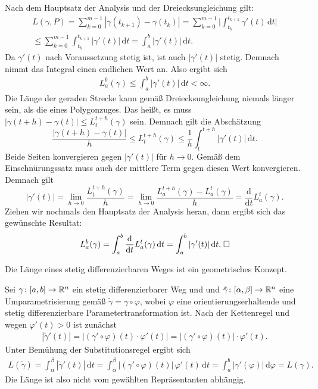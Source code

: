 \noindent{}
Nach dem Hauptsatz der Analysis und der Dreiecksungleichung gilt:
\begin{gather}
L(\gamma,P) = \sum_{k=0}^{m-1} |\gamma(t_{k+1})-\gamma(t_k)|
= \sum_{k=0}^{m-1} \Big|\int_{t_k}^{t_{k+1}}\gamma'(t)\,\mathrm dt\Big|\\
\le \sum_{k=0}^{m-1} \int_{t_k}^{t_{k+1}} |\gamma'(t)|\,\mathrm dt
= \int_a^b |\gamma'(t)|\,\mathrm dt.
\end{gather}
Da $\gamma'(t)$ nach Voraussetzung stetig ist, ist auch $|\gamma'(t)|$
stetig. Demnach nimmt das Integral einen endlichen Wert an. Also ergibt
sich
\begin{gather}
L_a^b(\gamma) \le \int_a^b |\gamma'(t)|\,\mathrm dt < \infty.
\end{gather}
Die Länge der geraden Strecke kann gemäß Dreiecksungleichung niemals
länger sein, als die eines Polygonzuges. Das heißt, es muss
$|\gamma(t+h)-\gamma(t)|\le L_t^{t+h}(\gamma)$ sein. Demnach
gilt die Abschätzung
\begin{equation}
\frac{|\gamma(t+h)-\gamma(t)|}{h}\le L_t^{t+h}(\gamma)
\le\frac{1}{h}\int_t^{t+h} |\gamma'(t)|\,\mathrm dt.
\end{equation}
Beide Seiten konvergieren gegen $|\gamma'(t)|$ für $h\to 0$.
Gemäß dem Einschnürungssatz muss auch der mittlere Term gegen diesen
Wert konvergieren. Demnach gilt
\begin{equation}
|\gamma'(t)| = \lim_{h\to 0}\frac{L_t^{t+h}(\gamma)}{h}
= \lim_{h\to 0}\frac{L_a^{t+h}(\gamma)-L_a^t(\gamma)}{h}
= \frac{\mathrm d}{\mathrm dt} L_a^t(\gamma).
\end{equation}
Ziehen wir nochmals den Hauptsatz der Analysis heran, dann ergibt
sich das gewünschte Resultat:
\begin{equation}
L_a^b(\gamma) = \int_a^b \frac{\mathrm d}{\mathrm dt} L_a^t(\gamma)\,\mathrm dt
= \int_a^b |\gamma'(t)|\,\mathrm dt.\;\Box
\end{equation}

\begin{theorem}
Die Länge eines stetig differenzierbaren Weges ist ein geometrisches
Konzept.
\end{theorem}

\noindent{}
Sei $\gamma\colon [a,b]\to\mathbb R^n$ ein stetig differenzierbarer Weg und
und $\tilde\gamma\colon [\alpha,\beta]\to\mathbb R^n$ eine Umparametrisierung
gemäß $\tilde\gamma = \gamma\circ\varphi$, wobei $\varphi$ eine
orientierungserhaltende und stetig differenzierbare Parametertransformation
ist. Nach der Kettenregel und wegen $\varphi'(t)>0$ ist zunächst
\begin{gather}
|\tilde\gamma'(t)| = |(\gamma'\circ\varphi)(t)\cdot\varphi'(t)|
= |(\gamma'\circ\varphi)(t)|\cdot\varphi'(t).
\end{gather}
Unter Bemühung der Substitutionsregel ergibt sich
\begin{gather}
L(\tilde\gamma) = \int_\alpha^\beta |\tilde\gamma'(t)|\,\mathrm dt
= \int_\alpha^\beta |(\gamma'\circ\varphi)(t)|\,\varphi'(t)\,\mathrm dt
= \int_a^b |\gamma'(\varphi)|\,\mathrm d\varphi = L(\gamma).
\end{gather}
Die Länge ist also nicht vom gewählten Repräsentanten
abhängig.\;\qedsymbol


